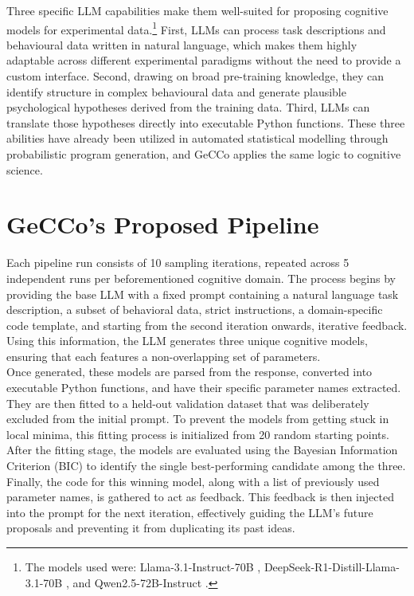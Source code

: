Three specific LLM capabilities make them well-suited for proposing cognitive models for experimental data.\footnote{The models used were: Llama-3.1-Instruct-70B \citep{meta2024llama3}, DeepSeek-R1-Distill-Llama-3.1-70B \citep{guo2025deepseek}, and Qwen2.5-72B-Instruct \citep{yang2024qwen25}.} First, LLMs can process task descriptions and behavioural data written in natural language, which makes them highly adaptable across different experimental paradigms without the need to provide a custom interface. Second, drawing on broad pre-training knowledge, they can identify structure in complex behavioural data and generate plausible psychological hypotheses derived from the training data. Third, LLMs can translate those hypotheses directly into executable Python functions. These three abilities have already been utilized in automated statistical modelling through probabilistic program generation, and GeCCo applies the same logic to cognitive science.

\section{GeCCo's Proposed Pipeline}

Each pipeline run consists of 10 sampling iterations, repeated across 5 independent runs per beforementioned cognitive domain. The process begins by providing the base LLM with a fixed prompt containing a natural language task description, a subset of behavioral data, strict instructions, a domain-specific code template, and starting from the second iteration onwards, iterative feedback. Using this information, the LLM generates three unique cognitive models, ensuring that each features a non-overlapping set of parameters. \\

Once generated, these models are parsed from the response, converted into executable Python functions, and have their specific parameter names extracted. They are then fitted to a held-out validation dataset that was deliberately excluded from the initial prompt. To prevent the models from getting stuck in local minima, this fitting process is initialized from 20 random starting points.\\

After the fitting stage, the models are evaluated using the Bayesian Information Criterion (BIC) to identify the single best-performing candidate among the three. Finally, the code for this winning model, along with a list of previously used parameter names, is gathered to act as feedback. This feedback is then injected into the prompt for the next iteration, effectively guiding the LLM's future proposals and preventing it from duplicating its past ideas.

